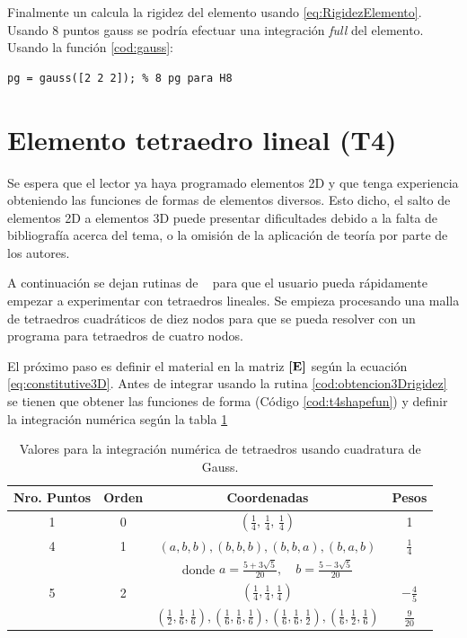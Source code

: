 Finalmente un calcula la rigidez del elemento usando \eqref{eq:RigidezElemento}. Usando 8 puntos gauss se podría efectuar una integración \textit{full} del elemento. Usando la función \ref{cod:gauss}:
\begin{lstlisting}
pg = gauss([2 2 2]); % 8 pg para H8 
\end{lstlisting}

\section{Elemento tetraedro lineal (T4)}
Se espera que el lector ya haya programado elementos 2D y que tenga experiencia obteniendo las funciones de formas de elementos diversos. Esto dicho, el salto de elementos 2D a elementos 3D puede presentar dificultades debido a la falta de bibliografía acerca del tema, o la omisión de la aplicación de teoría por parte de los autores.

A continuación se dejan rutinas de \Matlab~ para que el usuario pueda rápidamente empezar a experimentar con tetraedros lineales. Se empieza procesando una malla de tetraedros cuadráticos de diez nodos para que se pueda resolver con un programa para tetraedros de cuatro nodos.



El próximo paso es definir el material en la matriz $\boldsymbol{[}\mathbf{E} \boldsymbol{]}$ según la ecuación \eqref{eq:constitutive3D}. Antes de integrar usando la rutina \ref{cod:obtencion3Drigidez} se tienen que obtener las funciones de forma (Código \ref{cod:t4shapefun}) y definir la integración numérica según la tabla \ref{tab:gausstetraedros}




\begin{table}[htb!]
	\newcommand{\one}[1]{\frac{1}{#1}}
	\centering
	\begin{tabular}{cccc}
		Nro. Puntos & Orden & Coordenadas & Pesos \\ \hline \hline
		1 & 0 & \( \left(\frac{1}{4}, \,\frac{1}{4}, \, \frac{1}{4} \right)\) & 1 \\ [1pt] \hline
		4 & 1 & \(  (a,b,b), (b,b,b), (b,b,a), (b,a,b) \) & \( \frac{1}{4}\) \\ [2pt]
		&   &donde    \( a = \frac{5+3\sqrt{5}}{20}, \quad b =\frac{5-3\sqrt{5}}{20} \) & \\[2pt] \hline 
		5 & 2 & \( \left(\frac{1}{4}, \frac{1}{4}, \frac{1}{4} \right)\) & \( -\frac{4}{5}\)   \\[5pt]
		&   &  \( \left(\one{2},\one{6}, \one{6} \right), \left(\one{6},\one{6}, \one{6} \right), \left(\one{6},\one{6}, \one{2} \right), \left(\one{6},\one{2}, \one{6} \right) \) & \(\frac{9}{20}\)
	\end{tabular}
	\caption{Valores para la integración numérica de tetraedros usando cuadratura de Gauss.}
	\label{tab:gausstetraedros}
\end{table}

